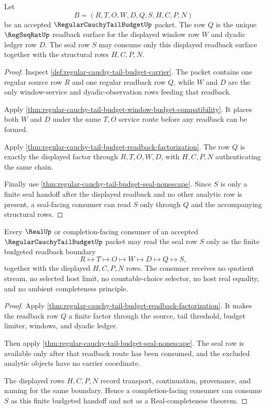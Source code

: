 \begin{theorem}
\label{thm:regular-cauchy-tail-budget-regseqrat-readback-seal-handoff}
Let
$$
B=(R,T,O,W,D,Q,S,H,C,P,N)
$$
be an accepted $\RegularCauchyTailBudgetUp$ packet. The row $Q$ is the unique $\RegSeqRatUp$ readback surface for the displayed window row $W$ and dyadic ledger row $D$. The seal row $S$ may consume only this displayed readback surface together with the structural rows $H,C,P,N$.
\end{theorem}
\begin{proof}
Inspect \autoref{def:regular-cauchy-tail-budget-carrier}. The packet contains one regular source row $R$ and one regular readback row $Q$, while $W$ and $D$ are the only window-service and dyadic-observation rows feeding that readback.

Apply \autoref{thm:regular-cauchy-tail-budget-window-budget-compatibility}. It places both $W$ and $D$ under the same $T,O$ service route before any readback can be formed.

Apply \autoref{thm:regular-cauchy-tail-budget-readback-factorization}. The row $Q$ is exactly the displayed factor through $R,T,O,W,D$, with $H,C,P,N$ authenticating the same chain.

Finally use \autoref{thm:regular-cauchy-tail-budget-seal-nonescape}. Since $S$ is only a finite seal handoff after the displayed readback and no other analytic row is present, a seal-facing consumer can read $S$ only through $Q$ and the accompanying structural rows.
\end{proof}

\begin{theorem}
\label{thm:regular-cauchy-tail-budget-completion-boundary}
Every $\RealUp$ or completion-facing consumer of an accepted $\RegularCauchyTailBudgetUp$ packet may read the seal row $S$ only as the finite budgeted readback boundary
$$
R \longmapsto T \longmapsto O \longmapsto W \longmapsto D \longmapsto Q \longmapsto S,
$$
together with the displayed $H,C,P,N$ rows. The consumer receives no quotient stream, no selected host limit, no countable-choice selector, no host real equality, and no ambient completeness principle.
\end{theorem}
\begin{proof}
Apply \autoref{thm:regular-cauchy-tail-budget-readback-factorization}. It makes the readback row $Q$ a finite factor through the source, tail threshold, budget limiter, windows, and dyadic ledger.

Then apply \autoref{thm:regular-cauchy-tail-budget-seal-nonescape}. The seal row is available only after that readback route has been consumed, and the excluded analytic objects have no carrier coordinate.

The displayed rows $H,C,P,N$ record transport, continuation, provenance, and naming for the same boundary. Hence a completion-facing consumer can consume $S$ as this finite budgeted handoff and not as a Real-completeness theorem.
\end{proof}

